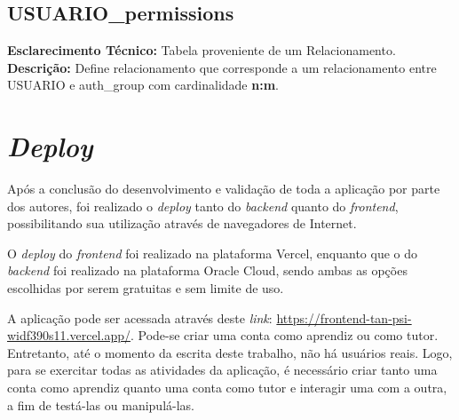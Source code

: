 \begin{apendicesenv}
\section*{USUARIO\_permissions}

\noindent\textbf{Esclarecimento Técnico:} Tabela proveniente de um Relacionamento. \\
\textbf{Descrição:} Define relacionamento que corresponde a um relacionamento entre USUARIO e auth\_group com cardinalidade \textbf{n:m}.

\begin{table}[H]
\centering
\label{tab:USUARIO_permissions}
\end{table}

\chapter{\textit{Deploy}}
\label{deploy}

Após a conclusão do desenvolvimento e validação de toda a aplicação por parte dos autores, foi realizado o \textit{deploy} tanto do \textit{backend} quanto do \textit{frontend}, possibilitando sua utilização através de navegadores de Internet.

O \textit{deploy} do \textit{frontend} foi realizado na plataforma Vercel, enquanto que o do \textit{backend} foi realizado na plataforma Oracle Cloud, sendo ambas as opções escolhidas por serem gratuitas e sem limite de uso.

A aplicação pode ser acessada através deste \textit{link}: \url{https://frontend-tan-psi-widf390s11.vercel.app/}. Pode-se criar uma conta como aprendiz ou como tutor. Entretanto, até o momento da escrita deste trabalho, não há usuários reais. Logo, para se exercitar todas as atividades da aplicação, é necessário criar tanto uma conta como aprendiz quanto uma conta como tutor e interagir uma com a outra, a fim de testá-las ou manipulá-las.

\end{apendicesenv}

